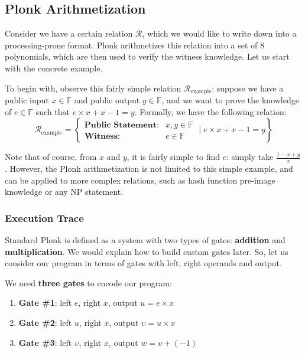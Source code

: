 \documentclass[../lecture-notes.tex]{subfiles}
\begin{document}
\subsection{Plonk Arithmetization}

Consider we have a certain relation $\mathcal{R}$, which we would like to write
down into a processing-prone format. Plonk arithmetizes this relation into a set
of 8 polynomials, which are then used to verify the witness knowledge. Let us 
start with the concrete example.

\begin{example}
To begin with, observe this fairly simple relation
$\mathcal{R}_{\text{example}}$: suppose we have a public input $x \in
\mathbb{F}$ and public output $y \in \mathbb{F}$, and we want to prove the knowledge of $e \in
\mathbb{F}$ such that $e \times x + x - 1 = y$. Formally, we have the following relation:
\begin{equation*}
    \mathcal{R}_{\text{example}} = \left\{ \begin{matrix}
        \textbf{Public Statement:} & x, y \in \mathbb{F} \\
        \textbf{Witness}: & e \in \mathbb{F}
    \end{matrix} \; \Big| \; e \times x + x - 1 = y \right\}
\end{equation*}

\end{example}

\begin{remark}
    Note that of course, from $x$ and $y$, it is fairly simple to find $e$: simply take $\frac{1 - x + y}{x}$. However, the Plonk arithmetization 
    is not limited to this simple example, and can be applied to more complex relations, such as hash function pre-image knowledge or any NP statement.
\end{remark}

\subsubsection{Execution Trace}

Standard Plonk is defined as a system with two types of gates: \textbf{addition}
and \textbf{multiplication}. We would explain how to build custom gates later.
So, let us consider our program in terms of gates with left, right operands and
output. 

\begin{example}
    We need \textbf{three gates} to encode our program:
    \begin{enumerate}
        \item \textbf{Gate \#1}: left $e$, right $x$, output \(u = e \times x\)
        \item \textbf{Gate \#2}: left $u$, right $x$, output \(\upsilon = u \times x\)
        \item \textbf{Gate \#3}: left $\upsilon$, right $x$, output \(w = \upsilon + (-1)\)
    \end{enumerate}
\end{example}
\end{document}
